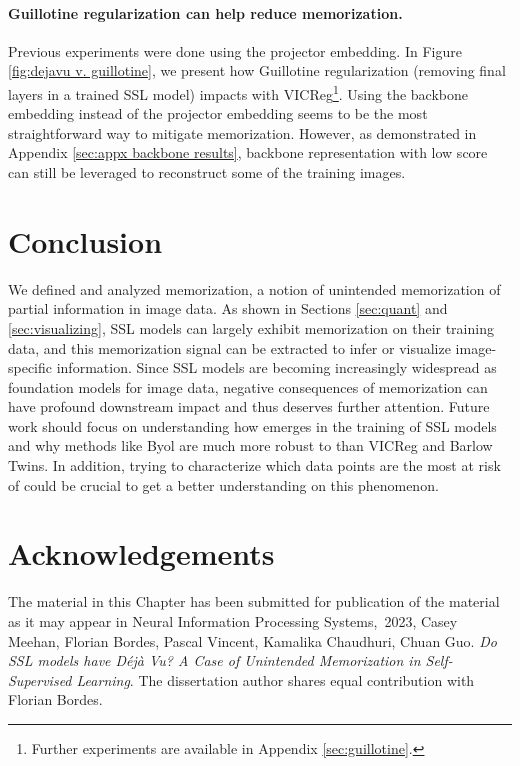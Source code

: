 \paragraph{Guillotine regularization can help reduce \dejavu memorization.} Previous experiments were done using the projector embedding. In Figure \ref{fig:dejavu v. guillotine}, we present how Guillotine regularization\citep{Guillotine} (removing final layers in a trained SSL model) impacts \dejavu with VICReg\footnote{Further experiments are available in Appendix \ref{sec:guillotine}.}. Using the backbone embedding instead of the projector embedding seems to be the most straightforward way to mitigate \dejavu memorization. However, as demonstrated in Appendix \ref{sec:appx backbone results}, backbone representation with low \dejavu score can still be leveraged to reconstruct some of the training images.

\section{Conclusion}
\label{sec:conclusion}

We defined and analyzed \dejavu memorization, a notion of unintended memorization of partial information in image data. As shown in Sections \ref{sec:quant} and \ref{sec:visualizing}, SSL models can largely exhibit \dejavu memorization on their training data, and this memorization signal can be extracted to infer or visualize image-specific information.
Since SSL models are becoming increasingly widespread as foundation models for image data, negative consequences of \dejavu memorization can have profound downstream impact and thus deserves further attention. 
Future work should focus on understanding how \dejavu emerges in the training of SSL models and why methods like Byol are much more robust to \dejavu than VICReg and Barlow Twins. In addition, trying to characterize which data points are the most at risk of \dejavu could be crucial to get a better understanding on this phenomenon. 

\section{Acknowledgements} 
The material in this Chapter has been submitted for publication of the material as it may appear in Neural Information Processing Systems,~2023, Casey Meehan, Florian Bordes, Pascal Vincent, Kamalika Chaudhuri, Chuan Guo. \emph{Do SSL models have Déjà Vu? A Case of Unintended Memorization in Self-Supervised Learning}. The dissertation author shares equal contribution with Florian Bordes. 
